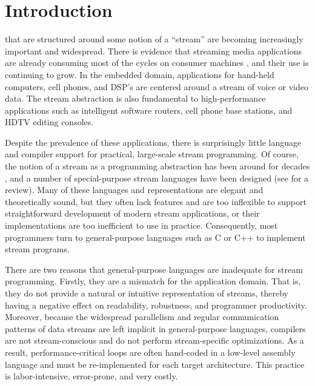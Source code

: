 \section{Introduction}

 that are structured around some notion of a
``stream'' are becoming increasingly important and widespread.  There
is evidence that streaming media applications are already consuming
most of the cycles on consumer machines \cite{Rix98}, and their use is
continuing to grow.  In the embedded domain, applications for
hand-held computers, cell phones, and DSP's are centered around a
stream of voice or video data.  The stream abstraction is also
fundamental to high-performance applications such as intelligent
software routers, cell phone base stations, and HDTV editing consoles.

Despite the prevalence of these applications, there is surprisingly
little language and compiler support for practical, large-scale stream
programming.  Of course, the notion of a stream as a programming
abstraction has been around for decades \cite{SICP}, and a number of
special-purpose stream languages have been designed (see
\cite{survey97} for a review).  Many of these languages and
representations are elegant and theoretically sound, but they often
lack features and are too inflexible to support straightforward
development of modern stream applications, or their implementations
are too inefficient to use in practice.  Consequently, most
programmers turn to general-purpose languages such as C or C++ to
implement stream programs.

There are two reasons that general-purpose languages are inadequate for
stream programming.  Firstly, they are a mismatch for the application
domain.  That is, they do not provide a natural or intuitive
representation of streams, thereby having a negative effect on
readability, robustness, and programmer productivity.  Moreover, because
the widespread parallelism and regular communication patterns of data
streams are left implicit in general-purpose languages, compilers are
not stream-conscious and do not perform stream-specific optimizations.
As a result, performance-critical loops are often hand-coded in a
low-level assembly language and must be re-implemented for each target
architecture.  This practice is labor-intensive, error-prone, and very
costly.

